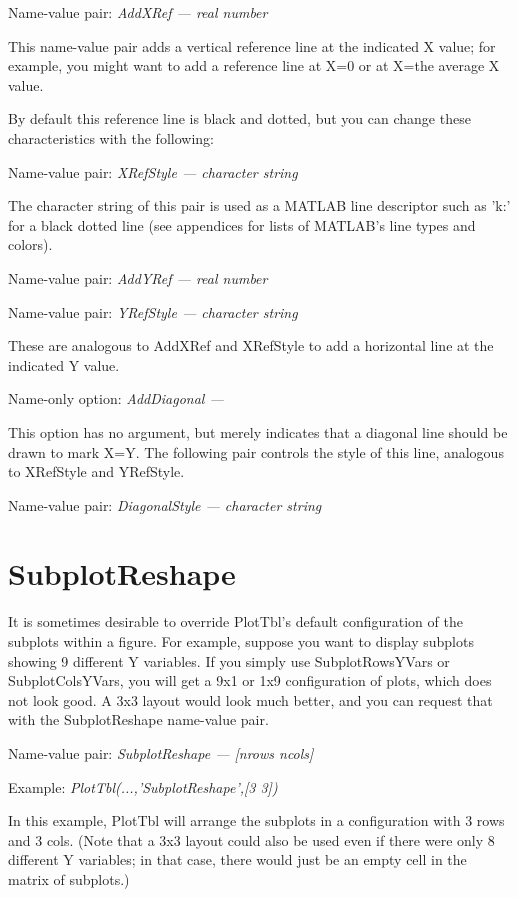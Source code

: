 \documentclass{article}
\newcommand{\example}[1]{Example: {\it #1}}
\newcommand{\namevalue}[2]{{\it #1 --- #2}}
\begin{document}
Name-value pair: \namevalue{AddXRef}{real number}

This name-value pair adds a vertical reference line at the indicated X value;
for example, you might want to add a reference line at X=0 or at X=the average X value.

By default this reference line is black and dotted, but you can change these characteristics
with the following:

Name-value pair: \namevalue{XRefStyle}{character string}

The character string of this pair is used as a MATLAB line descriptor such as 'k:' for a
black dotted line (see appendices for lists of MATLAB's line types and colors).

Name-value pair: \namevalue{AddYRef}{real number}

Name-value pair: \namevalue{YRefStyle}{character string}

These are analogous to AddXRef and XRefStyle to add a horizontal line at the indicated Y value.

Name-only option: \namevalue{AddDiagonal}{ }

This option has no argument, but merely indicates that a diagonal line should be drawn to mark X=Y.
The following pair controls the style of this line, analogous to XRefStyle and YRefStyle.

Name-value pair: \namevalue{DiagonalStyle}{character string}

\section{SubplotReshape}

It is sometimes desirable to override PlotTbl's default configuration of
the subplots within a figure.
For example, suppose you want to display subplots showing 9 different Y variables.
If you simply use SubplotRowsYVars or SubplotColsYVars, you will get a 9x1
or 1x9 configuration of plots, which does not look good.
A 3x3 layout would look much better, and you can request that with
the SubplotReshape name-value pair.

Name-value pair: \namevalue{SubplotReshape}{[nrows ncols]}

\example{PlotTbl(...,'SubplotReshape',[3 3])}

In this example, PlotTbl will arrange the subplots in a configuration with
3 rows and 3 cols.
(Note that a 3x3 layout could also be used even if there were only 8 different
Y variables; in that case, there would just be an empty cell in the matrix of
subplots.)
\end{document}
